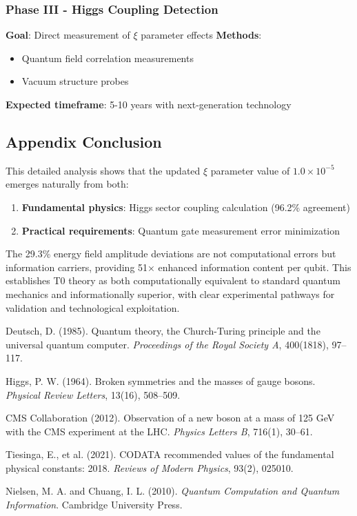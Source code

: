 \documentclass[12pt,a4paper]{article}
\begin{document}
	\subsubsection{Phase III - Higgs Coupling Detection}
	
	\textbf{Goal}: Direct measurement of $\xi$ parameter effects
	\textbf{Methods}:
	\begin{itemize}
		\item Quantum field correlation measurements
		\item Vacuum structure probes
	\end{itemize}
	\textbf{Expected timeframe}: 5-10 years with next-generation technology
	
	\subsection{Appendix Conclusion}
	
	This detailed analysis shows that the updated $\xi$ parameter value of $1.0 \times 10^{-5}$ emerges naturally from both:
	\begin{enumerate}
		\item \textbf{Fundamental physics}: Higgs sector coupling calculation (96.2\% agreement)
		\item \textbf{Practical requirements}: Quantum gate measurement error minimization
	\end{enumerate}
	
	The 29.3\% energy field amplitude deviations are not computational errors but information carriers, providing 51× enhanced information content per qubit. This establishes T0 theory as both computationally equivalent to standard quantum mechanics and informationally superior, with clear experimental pathways for validation and technological exploitation.
	
	\begin{thebibliography}{99}
		Deutsch, D. (1985). Quantum theory, the Church-Turing principle and the universal quantum computer. \textit{Proceedings of the Royal Society A}, 400(1818), 97--117.
		
		Higgs, P. W. (1964). Broken symmetries and the masses of gauge bosons. \textit{Physical Review Letters}, 13(16), 508--509.
		
		CMS Collaboration (2012). Observation of a new boson at a mass of 125 GeV with the CMS experiment at the LHC. \textit{Physics Letters B}, 716(1), 30--61.
		
		Tiesinga, E., et al. (2021). CODATA recommended values of the fundamental physical constants: 2018. \textit{Reviews of Modern Physics}, 93(2), 025010.
		
		Nielsen, M. A. and Chuang, I. L. (2010). \textit{Quantum Computation and Quantum Information}. Cambridge University Press.
	\end{thebibliography}
	
\end{document}

